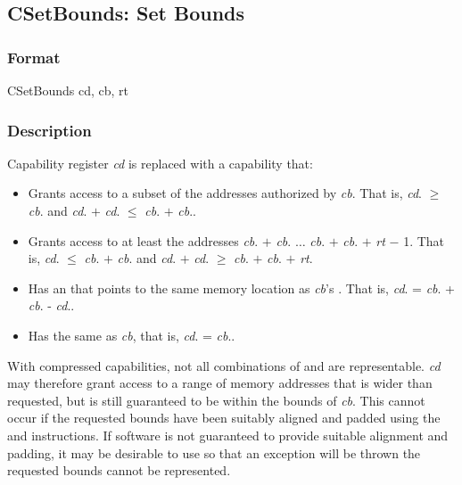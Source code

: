 \clearpage
{}
{}
\subsection*{CSetBounds: Set Bounds}

\subsubsection*{Format}

CSetBounds cd, cb, rt

\begin{center}
\end{center}

\subsubsection*{Description}

Capability register \emph{cd} is replaced with a capability that:

\begin{itemize}
\item
Grants access to a subset of the addresses authorized by \emph{cb}.
That is, \emph{cd}.\cbase{} $\ge$ \emph{cb}.\cbase{} and
\emph{cd}.\cbase{} $+$ \emph{cd}.\clength{} $\le$ \emph{cb}.\cbase{} $+$
\emph{cb}.\clength{}.
\item
Grants access to at least the addresses \emph{cb}.\cbase{} $+$
\emph{cb}.\coffset{} $\ldots$ \emph{cb}.\cbase{} $+$ \emph{cb}.\coffset{}
$+$ \emph{rt} $-$ 1.
That is, \emph{cd}.\cbase{} $\le$ \emph{cb}.\cbase{}
$+$ \emph{cb}.\coffset{} and \emph{cd}.\cbase{} $+$ \emph{cd}.\clength{}
$\ge$ \emph{cb}.\cbase{} $+$ \emph{cb}.\coffset{} $+$ \emph{rt}.
\item
Has an \coffset{} that points to the same memory location as \emph{cb}'s
\coffset{}.
That is, \emph{cd}.\coffset{} = \emph{cb}.\coffset{} + \emph{cb}.\cbase{} -
\emph{cd}.\cbase{}.
\item
Has the same \cperms{} as \emph{cb}, that is, \emph{cd}.\cperms{} = \emph{cb}.\cperms{}.
\end{itemize}

With compressed capabilities, not all combinations of \cbase{} and \clength{}
are representable.
\emph{cd} may therefore grant access to a range of memory addresses that is
wider than requested, but is still guaranteed to be within the bounds of
\emph{cb}.
This cannot occur if the requested bounds have been suitably aligned and
padded using the  and  instructions.
If software is not guaranteed to provide suitable alignment and padding, it
may be desirable to use  so that an exception will
be thrown the requested bounds cannot be represented.


